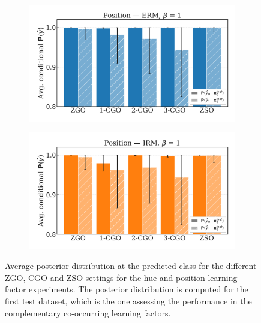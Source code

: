 \begin{figure}[H]
    \begin{subfigure}[b]{0.45\textwidth}
        \centering
        \includegraphics[width=\textwidth]{img/model_selection/posterior_erm_position.pdf}
    \end{subfigure}
    \hfill
    \begin{subfigure}[b]{0.45\textwidth}
        \centering
        \includegraphics[width=\textwidth]{img/model_selection/posterior_irm_position.pdf}
    \end{subfigure}

    \caption{
    Average posterior distribution at the predicted class for the different ZGO, CGO and ZSO settings
    for the hue and position learning factor experiments. The posterior distribution is computed
    for the first test dataset, which is the one assessing the performance in the complementary co-occurring
    learning factors. 
    }
    \label{fig:posterior_sogo}
\end{figure}

